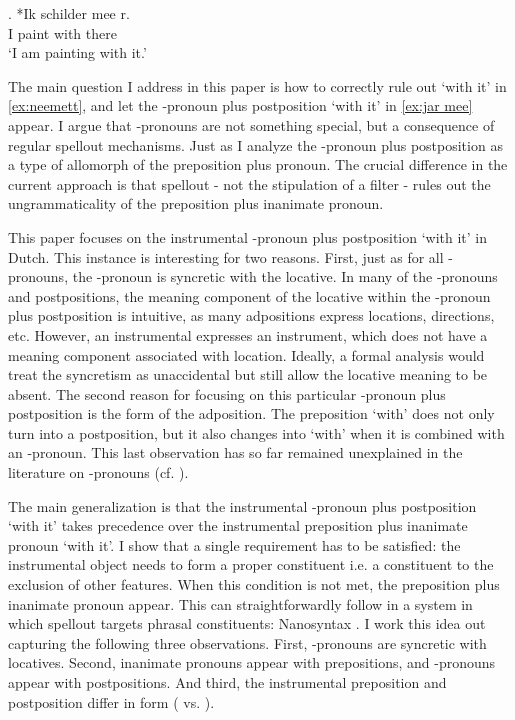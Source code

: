 \documentclass[11pt,a4paper]{article}
\begin{document}
\exg. *Ik schilder mee r.\\
 I paint with there\\
 `I am painting with it.'\label{ex:neemeer}

The main question I address in this paper is how to correctly rule out  `with it' in \ref{ex:neemett}, and let the -pronoun plus postposition  `with it' in \ref{ex:jar mee} appear. I argue that -pronouns are not something special, but a consequence of regular spellout mechanisms. Just as \citet{riemsdijk1978} I analyze the -pronoun plus postposition as a type of allomorph of the preposition plus pronoun. The crucial difference in the current approach is that spellout - not the stipulation of a filter - rules out the ungrammaticality of the preposition plus inanimate pronoun.

This paper focuses on the instrumental -pronoun plus postposition  `with it' in Dutch. This instance is interesting for two reasons. First, just as for all -pronouns, the -pronoun is syncretic with the locative. In many of the -pronouns and postpositions, the meaning component of the locative within the -pronoun plus postposition is intuitive, as many adpositions express locations, directions, etc. However, an instrumental expresses an instrument, which does not have a meaning component associated with location. Ideally, a formal analysis would treat the syncretism as unaccidental but still allow the locative meaning to be absent.
The second reason for focusing on this particular -pronoun plus postposition is the form of the adposition. The preposition  `with' does not only turn into a postposition, but it also changes into  `with' when it is combined with an -pronoun. This last observation has so far remained unexplained in the literature on -pronouns (cf. \citealt{koopman1994,riemsdijk1978,noonan2017dutch,abels2003diss}).

The main generalization is that the instrumental -pronoun plus postposition  `with it' takes precedence over the instrumental preposition plus inanimate pronoun  `with it'. I show that a single requirement has to be satisfied: the instrumental object needs to form a proper constituent i.e. a constituent to the exclusion of other features. When this condition is not met, the preposition plus inanimate pronoun appear. This can straightforwardly follow in a system in which spellout targets phrasal constituents: Nanosyntax \citep{starke2009}. I work this idea out capturing the following three observations. First, -pronouns are syncretic with locatives. Second, inanimate pronouns appear with prepositions, and -pronouns appear with postpositions. And third, the instrumental preposition and postposition differ in form ( vs. ).
\end{document}
